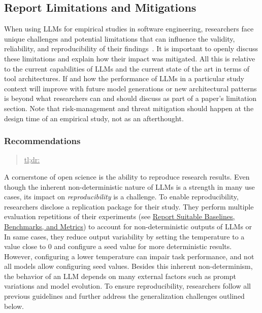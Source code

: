



\subsection{Report Limitations and Mitigations}

When using LLMs for empirical studies in software engineering, researchers face unique challenges and potential limitations that can influence the validity, reliability, and reproducibility of their findings~\cite{sallou2024breaking}.
It is important to openly discuss these limitations and explain how their impact was mitigated.
All this is relative to the current capabilities of LLMs and the current state of the art in terms of tool architectures.
If and how the performance of LLMs in a particular study context will improve with future model generations or new architectural patterns is beyond what researchers can and should discuss as part of a paper's limitation section.
Note that risk-management and threat mitigation should happen at the design time of an empirical study, not as an afterthought.

\subsubsection{Recommendations}

\begin{quote}
\underline{tl;dr:} 
\end{quote}


A cornerstone of open science is the ability to reproduce research results.
Even though the inherent non-deterministic nature of LLMs is a strength in many use cases, its impact on \emph{reproducibility} is a challenge. To enable reproducibility, researchers \should disclose a replication package for their study.
They \should perform multiple evaluation repetitions of their experiments (see \href{/guidelines/report-baselines-benchmarks-and-metrics}{Report Suitable Baselines, Benchmarks, and Metrics}) to account for non-deterministic outputs of LLMs or
In same cases, they \may reduce output variability by setting the temperature to a value close to 0 and configure a seed value for more deterministic results.
However, configuring a lower temperature can impair task performance, and not all models allow configuring seed values.
Besides this inherent non-determinism, the behavior of an LLM depends on many external factors such as prompt variations and model evolution.
To ensure reproducibility, researchers \should follow all previous guidelines and further address the generalization challenges outlined below.


